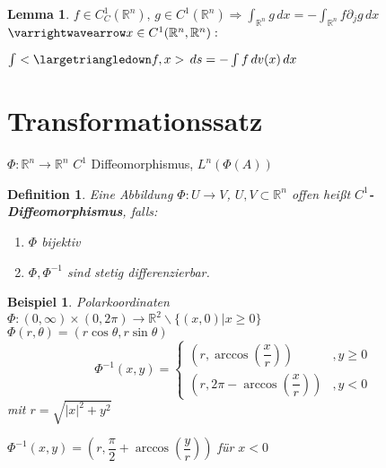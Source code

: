 \documentclass[11pt]{memoir}
\theoremstyle{changebreak}
\newtheorem{Definition}{Definition}[chapter]
\newtheorem{Beispiel}{Beispiel}[chapter]
\newtheorem{Lemma}{Lemma}[chapter]
\begin{document}
\begin{Lemma}
$f \in C^1_C(\mathbb R^n), \, g\in C^1(\mathbb R^n) \Rightarrow \int_{\mathbb R^n}g\, dx = - \int_{\mathbb R^n}f \partial_j g\, dx$ \\
$\varrightwavearrow x \in C^1(\mathbb R^n, \mathbb R^n):$
\begin{center}
	$\int <\largetriangledown f, x>\, ds = - \int f\, dv(x) \,dx$
\end{center}
\end{Lemma}


\section{Transformationssatz}


$\Phi: \mathbb R^n \rightarrow \mathbb R^n$ $C^1$ Diffeomorphismus, $L^n(\Phi(A))$

\begin{Definition}
Eine Abbildung $\Phi: U \rightarrow V$, $U, V \subset \mathbb R^n$ offen heißt \textbf{$C^1$-Diffeomorphismus}, falls:
\begin{enumerate}
	\item $\Phi$ bijektiv
	\item $\Phi, \Phi^{-1}$ sind stetig differenzierbar.
\end{enumerate}
\end{Definition}

\begin{Beispiel}
\emph{Polarkoordinaten} \\
$\Phi: (0, \infty) \times (0, 2\pi) \rightarrow \mathbb R^2 \backslash \{(x, 0)| x \geq 0\}$ \\
$\Phi(r, \theta) = (r \cos \theta, r \sin \theta)$ \\
\begin{equation}
	\Phi^{-1}(x, y) =
	\begin{cases}
		(r, \arccos\left(\dfrac{x}{r}\right)) & , y \geq 0 \\
		(r, 2\pi - \arccos\left(\dfrac{x}{r}\right)) & , y < 0
	\end{cases}
\end{equation}
mit $r = \sqrt{|x|^2 + y^2} $\\
\begin{center}
	$\Phi^{-1} (x, y) = \left(r, \dfrac{\pi}{2} + \arccos\left(\dfrac{y}{r}\right)\right)$ \quad für $x < 0$
\end{center}

\end{Beispiel}
\end{document}
